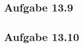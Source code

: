 \documentclass{standalone}
\begin{document}
\subsection{Aufgabe 13.9}


\subsection{Aufgabe 13.10}
\end{document}
